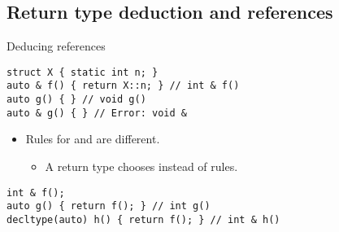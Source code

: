 \subsection{Return type deduction and references}

\begin{frame}[t,fragile]{Deducing references}
\begin{lstlisting}
struct X { static int n; }
auto & f() { return X::n; } // int & f()
auto g() { } // void g()
auto & g() { } // Error: void &
\end{lstlisting}

\begin{itemize}
  \pause 
  \item Rules for  and  are different.
    \begin{itemize}
      \item A return type  chooses 
            instead of  rules.
    \end{itemize}
\end{itemize}

\begin{lstlisting}
int & f();
auto g() { return f(); } // int g()
decltype(auto) h() { return f(); } // int & h()
\end{lstlisting}

\end{frame}
